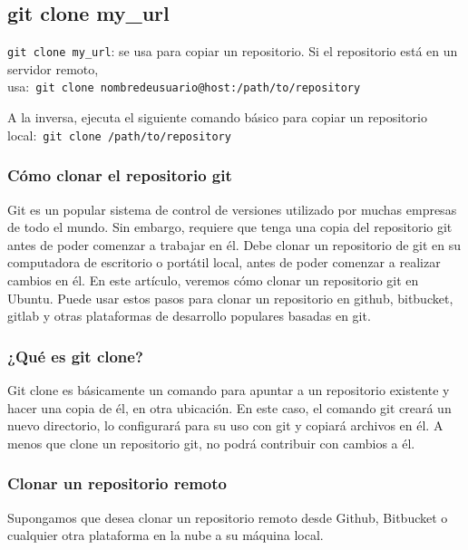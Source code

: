 \documentclass[
  a2paper,
]{article}
\begin{document}
\hypertarget{git-clone-my_url}{%
\subsection{git clone my\_url}\label{git-clone-my_url}}

\texttt{git\ clone\ my\_url}: se usa para copiar un repositorio. Si el
repositorio está en un servidor remoto,
usa:~\texttt{git\ clone\ nombredeusuario@host:/path/to/repository}~~

A la inversa, ejecuta el siguiente comando básico para copiar un
repositorio local:~\texttt{git\ clone\ /path/to/repository}

\hypertarget{cuxf3mo-clonar-el-repositorio-git}{%
\subsubsection{Cómo clonar el repositorio
git}\label{cuxf3mo-clonar-el-repositorio-git}}

Git es un popular sistema de control de versiones utilizado por muchas
empresas de todo el mundo. Sin embargo, requiere que tenga una copia del
repositorio git antes de poder comenzar a trabajar en él. Debe clonar un
repositorio de git en su computadora de escritorio o portátil local,
antes de poder comenzar a realizar cambios en él. En este artículo,
veremos cómo clonar un repositorio git en Ubuntu. Puede usar estos pasos
para clonar un repositorio en github, bitbucket, gitlab y otras
plataformas de desarrollo populares basadas en git.

\hypertarget{quuxe9-es-git-clone}{%
\subsubsection{¿Qué es git clone?}\label{quuxe9-es-git-clone}}

Git clone es básicamente un comando para apuntar a un repositorio
existente y hacer una copia de él, en otra ubicación. En este caso, el
comando git creará un nuevo directorio, lo configurará para su uso con
git y copiará archivos en él. A menos que clone un repositorio git, no
podrá contribuir con cambios a él.

\hypertarget{clonar-un-repositorio-remoto}{%
\subsubsection{Clonar un repositorio
remoto}\label{clonar-un-repositorio-remoto}}

Supongamos que desea clonar un repositorio remoto desde Github,
Bitbucket o cualquier otra plataforma en la nube a su máquina local.
\end{document}
